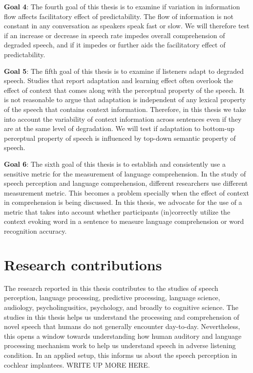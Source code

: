 \documentclass[a4paper, nobind]{templates/ociamthesis}
\begin{document}
\textbf{Goal 4}:
The fourth goal of this thesis is to examine if variation in information flow affects facilitatory effect of predictability.
The flow of information is not constant in any conversation as speakers speak fast or slow.
We will therefore test if an increase or decrease in speech rate impedes overall comprehension of degraded speech,
and if it impedes or further aids the facilitatory effect of predictability.

\textbf{Goal 5}:
The fifth goal of this thesis is to examine if listeners adapt to degraded speech.
Studies that report adaptation and learning effect often overlook the effect of context that comes along with the perceptual property of the speech.
It is not reasonable to argue that adaptation is independent of any lexical property of the speech that contains context information.
Therefore, in this thesis we take into account the variability of context information across sentences even if they are at the same level of degradation.
We will test if adaptation to bottom-up perceptual property of speech is influenced by top-down semantic property of speech.

\textbf{Goal 6}:
The sixth goal of this thesis is to establish and consistently use a sensitive metric for the measurement of language comprehension.
In the study of speech perception and language comprehension, different researchers use different measurement metric.
This becomes a problem specially when the effect of context in comprehension is being discussed.
In this thesis, we advocate for the use of a metric that takes into account whether participants (in)correctly utilize the context evoking word in a sentence to measure language comprehension or word recognition accuracy.

\hypertarget{research-contributions}{%
\section{Research contributions}\label{research-contributions}}

The research reported in this thesis contributes to the studies of speech perception, language processing, predictive processing, language science, audiology, psycholingusitics, psychology, and broadly to cognitive science.
The studies in this thesis helps us understand the processing and comprehension of novel speech that humans do not generally encounter day-to-day.
Nevertheless, this opens a window towards understanding how human auditory and language processing mechanism work to help us understand speech in adverse listening condition.
In an applied setup, this informs us about the speech perception in cochlear implantees. WRITE UP MORE HERE.
\end{document}
